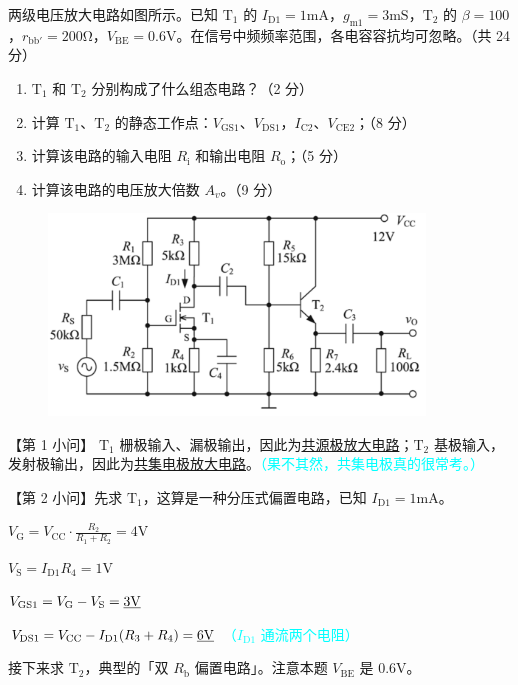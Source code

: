 \documentclass[UTF8]{ctexart}
\newcommand\xb[1]{_\mathrm{#1}}
\begin{document}

{\color{cyan!50!black}
两级电压放大电路如图所示。已知 $\mathrm{T_1}$ 的 $I\xb{D1} = \mathrm{1mA}$，$g\xb{m1} = \mathrm{3mS}$，$\mathrm{T_2}$ 的 $\beta = 100$，$r\xb{bb'} = \mathrm{200\Omega}$，$V\xb{BE}=\mathrm{0.6V}$。在信号中频频率范围，各电容容抗均可忽略。（共 24 分）

\begin{enumerate}[itemsep=0pt, parsep=0pt]
  \item $\mathrm{T_1}$ 和 $\mathrm{T_2}$ 分别构成了什么组态电路？（2 分）
  \item 计算 $\mathrm{T_1}$、$\mathrm{T_2}$ 的静态工作点：$V\xb{GS1}$、$V\xb{DS1}$，$I\xb{C2}$、$V\xb{CE2}$；（8 分）
  \item 计算该电路的输入电阻 $R\xb{i}$ 和输出电阻 $R\xb{o}$；（5 分）
  \item 计算该电路的电压放大倍数 $A_v$。（9 分）
\end{enumerate}

\begin{figure}[ht]
  \centering
  \includegraphics[width=10cm]{题图.png}
\end{figure}
}

\noindent 【第 1 小问】 $\mathrm{T_1}$ 栅极输入、漏极输出，因此为\uline{共源极放大电路}；$\mathrm{T_2}$ 基极输入，发射极输出，因此为\uline{共集电极放大电路}。\textcolor{cyan}{（果不其然，共集电极真的很常考。）}

\noindent 【第 2 小问】先求 $\mathrm{T_1}$，这算是一种分压式偏置电路，已知 $I\xb{D1}=\mathrm{1mA}$。

$V\xb{G} = V\xb{CC}\cdot\frac{R_2}{R_1+R_2} = \mathrm{4V}$

$V\xb{S} = I\xb{D1}R_4 = \mathrm{1V}$

$V\xb{GS1} = V\xb{G} - V\xb{S} = \uline{\mathrm{3V}}$

$V\xb{DS1} = V\xb{CC} - I\xb{D1}(R_3+R_4) = \uline{\mathrm{6V}}$ \textcolor{cyan}{（$I\xb{D1}$ 通流两个电阻）}

接下来求 $\mathrm{T_2}$，典型的「双 $R\xb{b}$ 偏置电路」。注意本题 $V\xb{BE}$ 是 0.6V。
\end{document}
